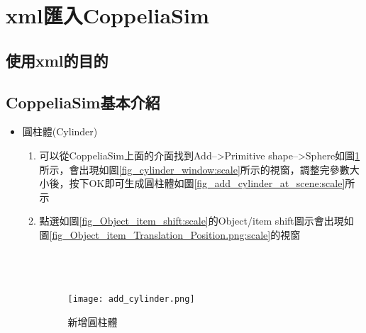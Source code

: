 \documentclass[14pt,a4paper]{report}  %
\newcommand{\fourteen}{\fontsize{14pt}{\baselineskip}\selectfont}%
\begin{document}
{    
    
      \section{xml匯入CoppeliaSim}
      \subsection{使用xml的目的}
      {\begin{flushleft}
      \quad \quad \fourteen {在CoppeliaSim4.1的版本可以使用xml檔自動匯入stl的零件檔，並且可以從中去設定物體的大小、重量、從屬關係....等等的參數都可以用xml檔來做調整，目的是打算在CoppeliaSim做到直接匯入就能直接完成所有的流程，不過因為技術上的問題，我們使用半自動的方式來完成腳踏車避震系統的動態模擬。}
      \end{flushleft}
      \subsection{CoppeliaSim基本介紹}
      {\begin{flushleft}
      \quad \quad \fourteen {在CoppeliaSim裡有內建的物體(shape)和馬達(joint)，其中我們比較常用到的是立方體(Cuboid)和旋轉接頭馬達(Revolute joint)，以下我們會對這2種物件進行介紹。}
      \end{flushleft}
      \begin{itemize}
      \item 圓柱體(Cylinder)
      	\begin{enumerate}
      	\item{可以從CoppeliaSim上面的介面找到Add-->Primitive shape-->Sphere如圖\ref{fig_add_cylinder:scale}所示，會出現如圖\ref{fig_cylinder_window:scale}所示的視窗，調整完參數大小後，按下OK即可生成圓柱體如圖\ref{fig_add_cylinder_at_scene:scale}所示}
      \item{點選如圖\ref{fig_Object_item_shift:scale}的Object/item shift圖示會出現如圖\ref{fig_Object_item_Translation_Position.png:scale}的視窗}\\\\\\\\



      \begin{figure}[hbt!]
        \centering
        \texttt{[image: add\_cylinder.png]} 
        \caption{新增圓柱體}
        \label{fig_add_cylinder:scale}
      \end{figure}
      

\end{enumerate}
\end{itemize}}}}
\end{document}
